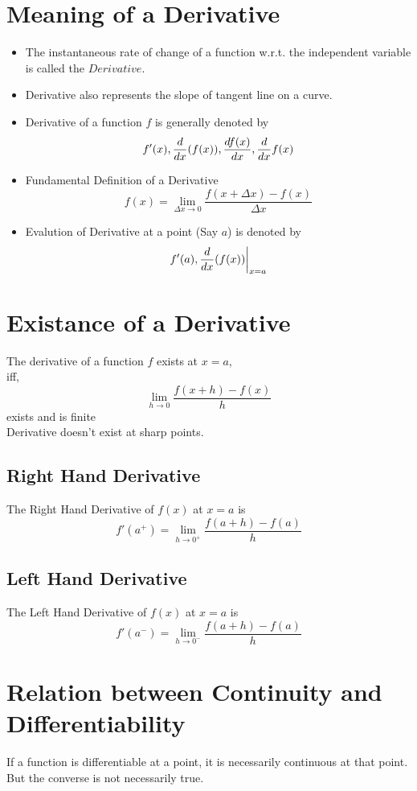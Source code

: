 \documentclass{article}
\begin{document}
\section{Meaning of a Derivative}
\begin{itemize}
    \item The instantaneous rate of change of a function w.r.t. the independent variable is called the $Derivative$.
    \item Derivative also represents the slope of tangent line on a curve.
    \item Derivative of a function $f$ is generally denoted by $$f'(x), \dv{x}(f(x)), \dv{f(x)}{x}, \dv{x}f(x)$$
    \item Fundamental Definition of a Derivative $$f(x)=\lim\limits_{\Delta x \to 0}{\dfrac{f(x+\Delta x)-f(x)}{\Delta x}}$$
    \item Evalution of Derivative at a point (Say $a$) is denoted by $$f'(a), \dv{x}(f(x)) \biggr\rvert_{x=a}$$
\end{itemize}

\section{Existance of a Derivative}
The derivative of a function $f$ exists at $x=a$,\\ iff, $$\lim\limits_{h \to 0}{\dfrac{f(x+h)-f(x)}{h}}$$ exists and is finite
\\ Derivative doesn't exist at sharp points.

\subsection{Right Hand Derivative}
The Right Hand Derivative of $f(x)$ at $x=a$ is 
$$f'(a^+)=\lim\limits_{h \to 0^+}{\frac{f(a+h)-f(a)}{h}}$$

\subsection{Left Hand Derivative}
The Left Hand Derivative of $f(x)$ at $x=a$ is 
$$f'(a^-)=\lim\limits_{h \to 0^-}{\dfrac{f(a+h)-f(a)}{h}}$$

\section{Relation between Continuity and \\Differentiability}
If a function is differentiable at a point, it is necessarily continuous at that point. But the converse is not necessarily true.
\end{document}
